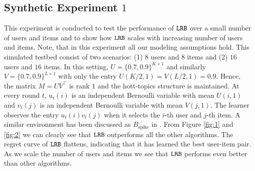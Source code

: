 \subsection{Synthetic Experiment $1$}
This experiment is conducted to test the performance of ${\tt LRB}$ over a small number of users and items and to show how ${\tt LRB}$ scales with increasing number of users and items. Note, that in this experiment all our modeling assumptions hold. This simulated testbed consist of two scenarios: (1) $8$ users and $8$ items and (2) $16$ users and $16$ items. In this setting, $U = \{0.7, 0.9\}^{K\times 1}$ and similarly $V = \{0.7, 0.9\}^{L\times 1}$ with only the entry $U(K/2,1) = V(L/2,1) = 0.9$. Hence, the matrix $M = UV^{\intercal}$ is rank $1$ and the hott-topics structure is maintained. At every round $t$, $u_t(i)$ is an independent Bernoulli variable with mean $U(i,1)$ and $v_t(j)$ is an independent Bernoulli variable with mean $V(j,1)$. The learner observes the entry $u_t(i)v_t(j)$ when it selects the $i$-th user and $j$-th item. A similar environment has been discussed as $B_{\text{spike}}$ in \citet{katariya2016stochastic}. From Figure \ref{fig:1} and \ref{fig:2} we can clearly see that ${\tt LRB}$ outperforms all the other algorithms. The regret curve of ${\tt LRB}$ flattens, indicating that it has learned the best user-item pair. As we scale the number of users and items we see that ${\tt LRB}$ performs even better than other algorithms. 


